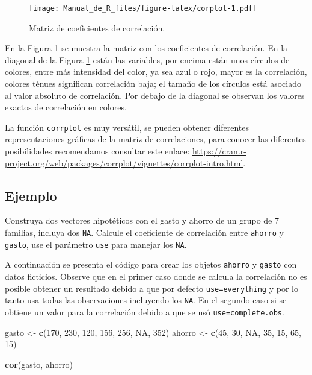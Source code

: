 \documentclass[10pt,]{krantz}
\makeatletter
\newenvironment{Shaded}{\begin{snugshade}}{\end{snugshade}}
\newcommand{\KeywordTok}[1]{\textcolor[rgb]{0.13,0.29,0.53}{\textbf{{#1}}}}
\newcommand{\DecValTok}[1]{\textcolor[rgb]{0.00,0.00,0.81}{{#1}}}
\newcommand{\StringTok}[1]{\textcolor[rgb]{0.31,0.60,0.02}{{#1}}}
\newcommand{\OtherTok}[1]{\textcolor[rgb]{0.56,0.35,0.01}{{#1}}}
\newcommand{\NormalTok}[1]{{#1}}
\newenvironment{kframe}{%
\medskip{}
\setlength{\fboxsep}{.8em}
 \def\at@end@of@kframe{}%
 \ifinner\ifhmode%
  \def\at@end@of@kframe{\end{minipage}}%
  \begin{minipage}{\columnwidth}%
 \fi\fi%
 \def\FrameCommand##1{\hskip\@totalleftmargin \hskip-\fboxsep
 \colorbox{shadecolor}{##1}\hskip-\fboxsep
     \hskip-\linewidth \hskip-\@totalleftmargin \hskip\columnwidth}%
 \MakeFramed {\advance\hsize-\width
   \@totalleftmargin\z@ \linewidth\hsize
   \@setminipage}}%
 {\par\unskip\endMakeFramed%
 \at@end@of@kframe}
\renewenvironment{Shaded}{\begin{kframe}}{\end{kframe}}
\let\BeginKnitrBlock\begin \let\EndKnitrBlock\end
\makeatother
\begin{document}
\begin{figure}[htbp]
\centering
\texttt{[image: Manual\_de\_R\_files/figure-latex/corplot-1.pdf]}
\caption{\label{fig:corplot}Matriz de coeficientes de correlación.}
\end{figure}

En la Figura \ref{fig:corplot} se muestra la matriz con los coeficientes
de correlación. En la diagonal de la Figura \ref{fig:corplot} están las
variables, por encima están unos círculos de colores, entre más
intensidad del color, ya sea azul o rojo, mayor es la correlación,
colores ténues significan correlación baja; el tamaño de los círculos
está asociado al valor absoluto de correlación. Por debajo de la
diagonal se observan los valores exactos de correlación en colores.

\BeginKnitrBlock{rmdtip}
La función \texttt{corrplot} es muy versátil, se pueden obtener
diferentes representaciones gráficas de la matriz de correlaciones, para
conocer las diferentes posibilidades recomendamos consultar este enlace:
\url{https://cran.r-project.org/web/packages/corrplot/vignettes/corrplot-intro.html}.
\EndKnitrBlock{rmdtip}

\subsection*{Ejemplo}\label{ejemplo-41}


Construya dos vectores hipotéticos con el gasto y ahorro de un grupo de
7 familias, incluya dos \texttt{NA}. Calcule el coeficiente de
correlación entre \texttt{ahorro} y \texttt{gasto}, use el parámetro
\texttt{use} para manejar los \texttt{NA}.

A continuación se presenta el código para crear los objetos
\texttt{ahorro} y \texttt{gasto} con datos ficticios. Observe que en el
primer caso donde se calcula la correlación no es posible obtener un
resultado debido a que por defecto
\texttt{use=\textquotesingle{}everything\textquotesingle{}} y por lo
tanto usa todas las observaciones incluyendo los \texttt{NA}. En el
segundo caso si se obtiene un valor para la correlación debido a que se
usó \texttt{use=\textquotesingle{}complete.obs\textquotesingle{}}.

\begin{Shaded}
\begin{Highlighting}[]
\NormalTok{gasto <-}\StringTok{ }\KeywordTok{c}\NormalTok{(}\DecValTok{170}\NormalTok{, }\DecValTok{230}\NormalTok{, }\DecValTok{120}\NormalTok{, }\DecValTok{156}\NormalTok{, }\DecValTok{256}\NormalTok{, }\OtherTok{NA}\NormalTok{, }\DecValTok{352}\NormalTok{)}
\NormalTok{ahorro <-}\StringTok{ }\KeywordTok{c}\NormalTok{(}\DecValTok{45}\NormalTok{, }\DecValTok{30}\NormalTok{, }\OtherTok{NA}\NormalTok{, }\DecValTok{35}\NormalTok{, }\DecValTok{15}\NormalTok{, }\DecValTok{65}\NormalTok{, }\DecValTok{15}\NormalTok{)}

\KeywordTok{cor}\NormalTok{(gasto, ahorro)}
\end{Highlighting}
\end{Shaded}
\end{document}
